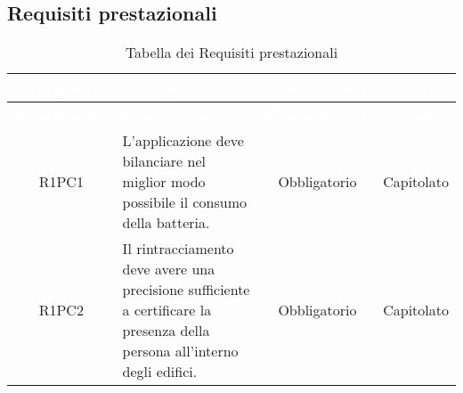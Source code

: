\subsection{Requisiti prestazionali}
{
\renewcommand{\arraystretch}{1.5}
\centering
\begin{longtable}{ c C{6.5cm} c c}
\caption{Tabella dei Requisiti prestazionali}\\
\textcolor{white}{\textbf{Identificativo}} & \textcolor{white}{\textbf{Descrizione}} & \textcolor{white}{\textbf{Classificazione}} & \textcolor{white}{\textbf{Fonti}}\\	
\endfirsthead
{}
\textcolor{white}{\textbf{Identificativo}} & \textcolor{white}{\textbf{Descrizione}} & \textcolor{white}{\textbf{Classificazione}} & \textcolor{white}{\textbf{Fonti}}\\
\endhead

R1PC1 & L'applicazione deve bilanciare nel miglior modo possibile il consumo della batteria. & Obbligatorio & Capitolato\\

R1PC2 & Il rintracciamento deve avere una precisione sufficiente a certificare la presenza della persona all'interno degli edifici. & Obbligatorio & Capitolato\\

\end{longtable}
}